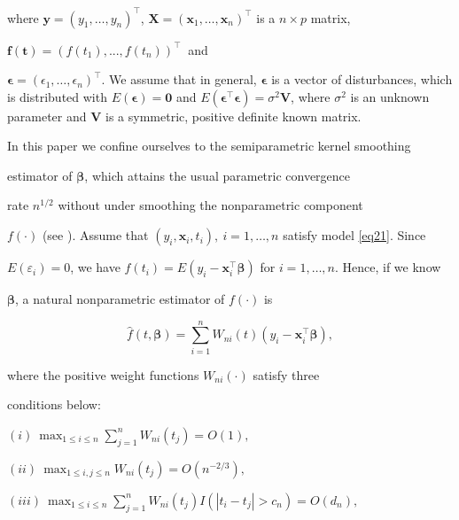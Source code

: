 \documentclass[10pt,twoside]{article}
\numberwithin{equation}{section}
\begin{document}
where $\boldsymbol{y} = (y_1,\ldots,y_n)^\top$, $\boldsymbol{X}=(\boldsymbol x_1,\ldots,\boldsymbol x_n)^\top$ is a $n\times p$ matrix,

$\boldsymbol{f}(\boldsymbol t)=(f(t_1),...,f(t_n))^\top~$ and

$\boldsymbol{\epsilon}=(\epsilon_1,\ldots,\epsilon_n)^\top$. We assume that in general, $\boldsymbol{\epsilon}$ is a vector of disturbances, which is distributed with $E(\boldsymbol{\epsilon})=\boldsymbol0$ and $E(\boldsymbol{\epsilon}^\top\boldsymbol{\epsilon})=\sigma^2\boldsymbol V$, where $\sigma^2$ is an unknown parameter and $\boldsymbol V$ is a symmetric, positive definite known matrix.



In this paper we confine ourselves to the semiparametric kernel smoothing

estimator of $\boldsymbol\beta$, which attains the usual parametric convergence

rate $n^{1/2}$ without under smoothing the nonparametric component

$f(\cdot)$ (see \cite{sp1988}). Assume that $(y_i,\boldsymbol x_{i},t_i),~i=1,\ldots,n$ satisfy model \eqref{eq21}. Since

$E(\varepsilon_i)=0$, we have $f(t_i)=E(y_i-\boldsymbol{x}^\top_i\boldsymbol\beta)$ for $i= 1,\ldots,n$. Hence, if we know

$\boldsymbol\beta$, a natural nonparametric estimator of $f(\cdot)$ is

\begin{equation}\label{eq22}

\hat{f}(t, \boldsymbol\beta) = \sum_{i=1}^n W_{ni}(t)(y_i -

\boldsymbol{x}^\top_i\boldsymbol\beta),

\end{equation}

where the positive weight functions $W_{ni}(\cdot)$ satisfy three

conditions below:



\noindent$(i)~ \max_{1\leq i\leq n}\sum_{j=1}^nW_{ni}(t_j) = O(1),$



\noindent$(ii)~\max_{1\leq i,j\leq n}W_{ni}(t_j)=O(n^{-2/3}),$



\noindent$(iii)~ \max_{1\leq i\leq n}\sum_{j=1}^nW_{ni}(t_j)I(|t_i -t_j|> c_n)=O(d_n),$
\end{document}

